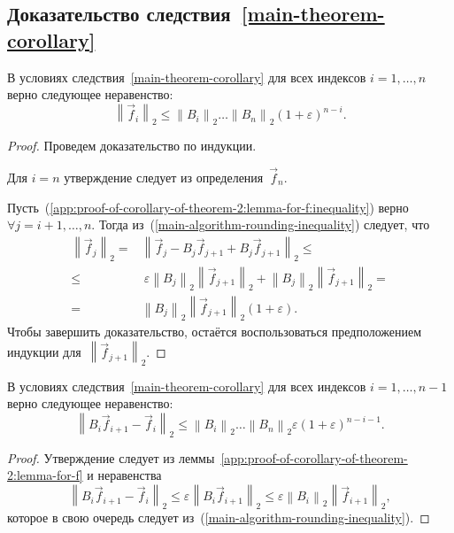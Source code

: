 \subsection{Доказательство следствия~\ref{main-theorem-corollary}}

\begin{lemma}
\label{app:proof-of-corollary-of-theorem-2:lemma-for-f}
В условиях следствия~\ref{main-theorem-corollary} для всех индексов $i = 1, \ldots, n$ верно следующее неравенство:
\begin{equation}
\label{app:proof-of-corollary-of-theorem-2:lemma-for-f:inequality}
\left\| \vec{f}_i \right\|_2 \leq \left\| B_i \right\|_2 \ldots \left\| B_n \right\|_2 (1 + \varepsilon)^{n - i}.
\end{equation}
\end{lemma}
\begin{proof}
Проведем доказательство по индукции.

Для $i = n$ утверждение следует из определения~$\vec{f}_n$.

Пусть~(\ref{app:proof-of-corollary-of-theorem-2:lemma-for-f:inequality}) верно $\forall j = i + 1, \ldots, n$. Тогда из~(\ref{main-algorithm-rounding-inequality}) следует, что
\begin{align*}
\left\| \vec{f}_j \right\|_2 = &\left\| \vec{f}_j - B_j\vec{f}_{j + 1} + B_j\vec{f}_{j + 1} \right\|_2 \leq \\
\leq & ~ \varepsilon \left\| B_j \right\|_2 \left\| \vec{f}_{j + 1} \right \|_2 + \left\| B_j \right\|_2 \left\| \vec{f}_{j + 1} \right \|_2 = \\
 = &\left\| B_j \right\|_2 \left\| \vec{f}_{j + 1} \right \|_2 (1 + \varepsilon).
\end{align*}
Чтобы завершить доказательство, остаётся воспользоваться предположением индукции для~$\left\| \vec{f}_{j + 1} \right \|_2$.
\end{proof}

\begin{lemma}
\label{app:proof-of-corollary-of-theorem-2:lemma-for-difference}
В условиях следствия~\ref{main-theorem-corollary} для всех индексов $i = 1, \ldots, n - 1$ верно следующее неравенство:
\begin{equation}
\label{app:proof-of-corollary-of-theorem-2:lemma-for-difference:inequality}
\left\| B_i \vec{f}_{i + 1} - \vec{f}_i \right\|_2 \leq \left\| B_i \right\|_2 \ldots \left\| B_n \right\|_2 \varepsilon (1 + \varepsilon)^{n - i - 1}.
\end{equation}
\end{lemma}
\begin{proof}
Утверждение следует из леммы~\ref{app:proof-of-corollary-of-theorem-2:lemma-for-f} и неравенства
\begin{equation*}
\left\| B_i \vec{f}_{i + 1} - \vec{f}_i \right\|_2 \leq \varepsilon \left\| B_i \vec{f}_{i + 1} \right\|_2 \leq \varepsilon \left\| B_i \right\|_2 \left\| \vec{f}_{i + 1} \right\|_2,
\end{equation*}
которое в свою очередь следует из~(\ref{main-algorithm-rounding-inequality}).
\end{proof}


